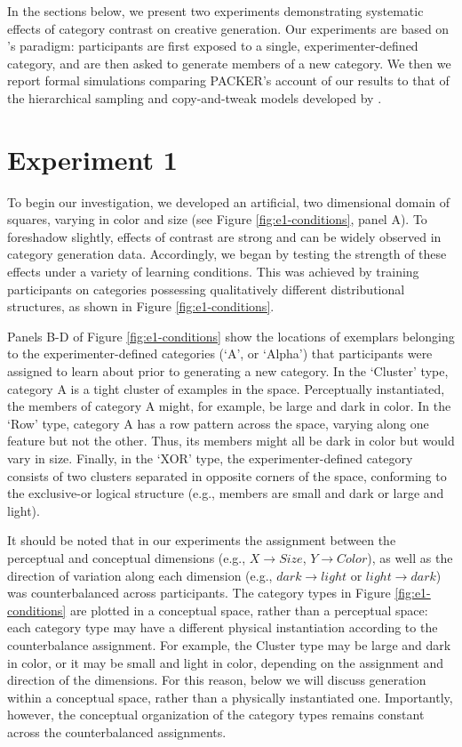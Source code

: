 \documentclass[12pt]{article}
\begin{document}
\begin{flushleft}
In the sections below, we present two experiments demonstrating systematic effects of category contrast on creative generation. Our experiments are based on \cite{jern2013probabilistic}'s paradigm: participants are first exposed to a single, experimenter-defined category, and are then asked to generate members of a new category. We then we report formal simulations comparing PACKER's account of our results to that of the hierarchical sampling and copy-and-tweak models developed by \cite{jern2013probabilistic}.


\section{Experiment 1}

To begin our investigation, we developed an artificial, two dimensional domain of squares, varying in color and size (see Figure \ref{fig:e1-conditions}, panel A). To foreshadow slightly, effects of contrast are strong and can be widely observed in category generation data. Accordingly, we began by testing the strength of these effects under a variety of learning conditions. This was achieved by training participants on categories possessing qualitatively different distributional structures, as shown in Figure \ref{fig:e1-conditions}. 

Panels B-D of Figure \ref{fig:e1-conditions} show the locations of exemplars belonging to the experimenter-defined categories (`A', or `Alpha') that participants were assigned to learn about prior to generating a new category. In the `Cluster' type, category A is a tight cluster of examples in the space. Perceptually instantiated, the members of category A might, for example, be large and dark in color. In the `Row' type, category A has a row pattern across the space, varying along one feature but not the other. Thus, its members might all be dark in color but would vary in size. Finally, in the `XOR' type, the experimenter-defined category consists of two clusters separated in opposite corners of the space, conforming to the exclusive-or logical structure (e.g., members are small and dark or large and light). 

It should be noted that in our experiments the assignment between the perceptual and conceptual dimensions (e.g., $X \rightarrow Size$, $Y \rightarrow Color$), as well as the direction of variation along each dimension (e.g., $dark \rightarrow light$ or $light \rightarrow dark$) was counterbalanced across participants. The category types in Figure \ref{fig:e1-conditions} are plotted in a conceptual space, rather than a perceptual space: each category type may have a different physical instantiation according to the counterbalance assignment. For example, the Cluster type  may be large and dark in color, or it may be small and light in color, depending on the assignment and direction of the dimensions. For this reason, below we will discuss generation within a conceptual space, rather than a physically instantiated one. Importantly, however, the conceptual organization of the category types remains constant across the counterbalanced assignments.


\end{flushleft}
\end{document}
